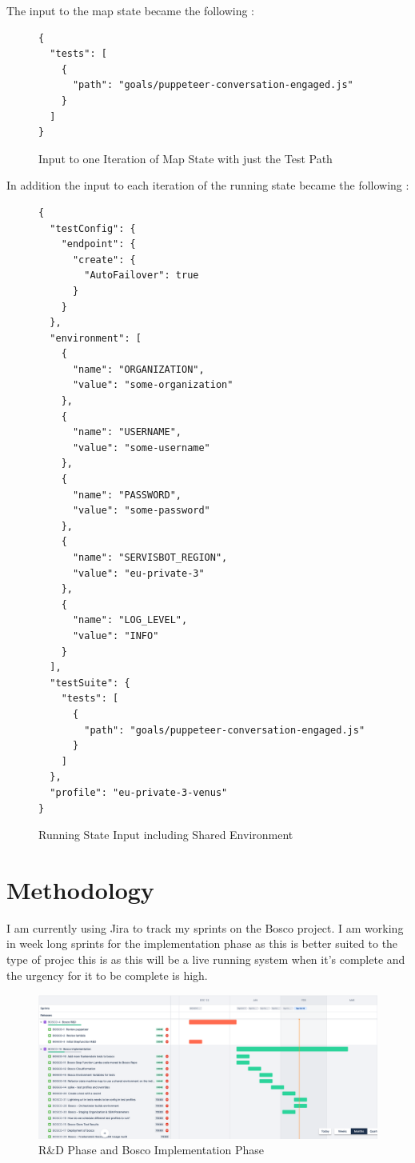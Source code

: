 \documentclass[12pt,a4paper,titlepage]{report}
\begin{document}
The input to the map state became the following :

\begin{figure}[H]
  \begin{tcolorbox}
    \begin{verbatim}
{
  "tests": [
    {
      "path": "goals/puppeteer-conversation-engaged.js"
    }
  ]
}
\end{verbatim}
  \end{tcolorbox}
  \caption{Input to one Iteration of Map State with just the Test Path}
\end{figure}

In addition the input to each iteration of the running state became the following :

\begin{figure}[H]
  \begin{tcolorbox}
    \begin{verbatim}
{
  "testConfig": {
    "endpoint": {
      "create": {
        "AutoFailover": true
      }
    }
  },
  "environment": [
    {
      "name": "ORGANIZATION",
      "value": "some-organization"
    },
    {
      "name": "USERNAME",
      "value": "some-username"
    },
    {
      "name": "PASSWORD",
      "value": "some-password"
    },
    {
      "name": "SERVISBOT_REGION",
      "value": "eu-private-3"
    },
    {
      "name": "LOG_LEVEL",
      "value": "INFO"
    }
  ],
  "testSuite": {
    "tests": [
      {
        "path": "goals/puppeteer-conversation-engaged.js"
      }
    ]
  },
  "profile": "eu-private-3-venus"
}

\end{verbatim}
  \end{tcolorbox}
  \caption{Running State Input including Shared Environment}
\end{figure}

\appendix
\chapter{Methodology}
I am currently using Jira to track my sprints on the Bosco project. I am working in week long sprints for the implementation phase as this
is better suited to the type of projec this is as this will be a live running system when it's complete and the urgency for it to be complete is high.

\begin{figure}[h]
  \centering
  \includegraphics[width=15cm]{./diagrams/sprints1.png}
  \caption{R\&D Phase and Bosco Implementation Phase}
\end{figure}
\end{document}
